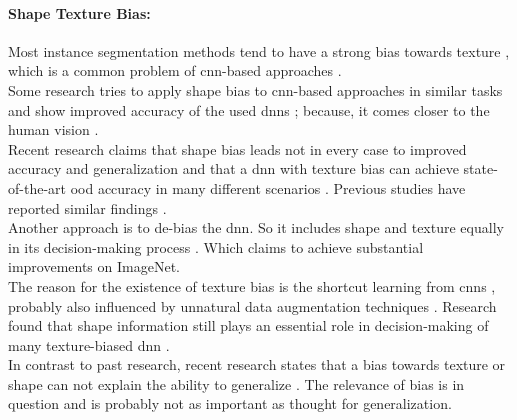 		\paragraph{Shape Texture Bias:} Most instance segmentation methods tend to have a strong bias towards texture \cite{Theodoridis2022}, which is a common problem of \ac{cnn}-based approaches \cite{Geirhos2022}\cite{Baker2018}\cite{Tabak2023}.\\
		Some research tries to apply shape bias to \ac{cnn}-based approaches in similar tasks and show improved accuracy of the used \ac{dnn}s \cite{Geirhos2022}\cite{Hermann2020}; because, it comes closer to the human vision \cite{Geirhos2020}\cite{Mohla2022}\cite{Baker2020}.\\
		Recent research claims that shape bias leads not in every case to improved accuracy and generalization and that a \ac{dnn} with texture bias can achieve state-of-the-art \ac{ood} accuracy in many different scenarios \cite{Qiu2024}. Previous studies have reported similar findings \cite{Brochu2019}.\\
		Another approach is to de-bias the \ac{dnn}. So it includes shape and texture equally in its decision-making process \cite{Li2021}\cite{Co2021}\cite{Chung2023}. Which claims to achieve substantial improvements on ImageNet. \\
		The reason for the existence of texture bias is the shortcut learning from \ac{cnn}s \cite{Geirhos2020}, probably also influenced by unnatural data augmentation techniques \cite{Hermann2020}. Research found that shape information still plays an essential role in decision-making of many texture-biased \ac{dnn} \cite{Tabak2023}.\\
		In contrast to past research, recent research states that a bias towards texture or shape can not explain the ability to generalize \cite{Gavrikov2024}. The relevance of bias is in question and is probably not as important as thought for generalization. %
